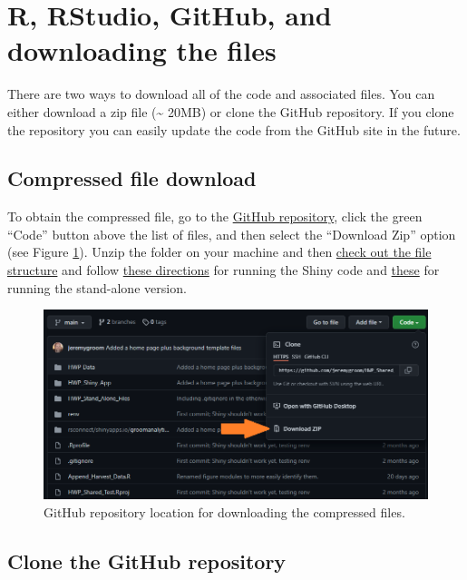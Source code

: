 \documentclass[
  openany]{book}
\begin{document}
\hypertarget{dnld-git}{%
\section{R, RStudio, GitHub, and downloading the files}\label{dnld-git}}

There are two ways to download all of the code and associated files. You can either download a zip file (\textasciitilde{} 20MB) or clone the GitHub repository. If you clone the repository you can easily update the code from the GitHub site in the future.

\hypertarget{dnld-git-zip}{%
\subsection{Compressed file download}\label{dnld-git-zip}}

To obtain the compressed file, go to the \href{https://github.com/jeremygroom/HWP-C-vR.git}{GitHub repository}, click the green ``Code'' button above the list of files, and then select the ``Download Zip'' option (see Figure \ref{fig:zip-fig}). Unzip the folder on your machine and then \href{https://jeremygroom.github.io/HWP-vR-Documentation/run.html\#dnld-files}{check out the file structure} and follow \href{https://jeremygroom.github.io/HWP-vR-Documentation/run.html\#dnld-shiny}{these directions} for running the Shiny code and \href{https://jeremygroom.github.io/HWP-vR-Documentation/run.html\#dnld-sa}{these} for running the stand-alone version.

\begin{figure}
\includegraphics[width=1\linewidth]{images/zip} \caption{GitHub repository location for downloading the compressed files.}\label{fig:zip-fig}
\end{figure}

\hypertarget{dnld-git-git}{%
\subsection{Clone the GitHub repository}\label{dnld-git-git}}
\end{document}
